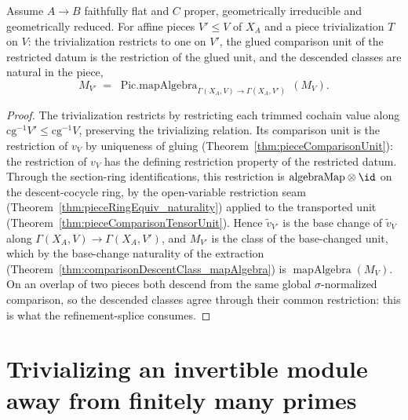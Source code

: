 \begin{theorem}
  \label{thm:pieceDescentClass_res}
  \leanok
  Assume \(A \to B\) faithfully flat and \(C\) proper, geometrically irreducible and geometrically
  reduced. For affine pieces \(V' \le V\) of \(X_A\) and a piece trivialization \(T\) on \(V\): the
  trivialization restricts to one on \(V'\), the glued comparison unit of the restricted datum is the
  restriction of the glued unit, and the descended classes are natural in the piece,
  \[
    M_{V'} \;=\; \operatorname{Pic.mapAlgebra}_{\Gamma(X_A, V) \to \Gamma(X_A, V')}\,(M_V) .
  \]
\end{theorem}
\begin{proof}
  \leanok
  The trivialization restricts by restricting each trimmed cochain value along \(\mathrm{cg}^{-1}V'
  \le \mathrm{cg}^{-1}V\), preserving the trivializing relation. Its comparison unit is the
  restriction of \(v_V\) by uniqueness of gluing (Theorem~\ref{thm:pieceComparisonUnit}): the
  restriction of \(v_V\) has the defining restriction property of the restricted datum. Through the
  section-ring identifications, this restriction is \(\mathrm{algebraMap} \otimes \id\) on the
  descent-cocycle ring, by the open-variable restriction seam
  (Theorem~\ref{thm:pieceRingEquiv_naturality}) applied to the transported unit
  (Theorem~\ref{thm:pieceComparisonTensorUnit}). Hence \(\tilde v_{V'}\) is the base change of
  \(\tilde v_V\) along \(\Gamma(X_A, V) \to \Gamma(X_A, V')\), and \(M_{V'}\) is the class of the
  base-changed unit, which by the base-change naturality of the extraction
  (Theorem~\ref{thm:comparisonDescentClass_mapAlgebra}) is
  \(\operatorname{mapAlgebra}(M_V)\). On an overlap of two pieces both descend from the same global
  \(\sigma\)-normalized comparison, so the descended classes agree through their common restriction:
  this is what the refinement-splice consumes.
\end{proof}

\section{Trivializing an invertible module away from finitely many primes}
\label{sec:effectivityInvertibleAvoid}

